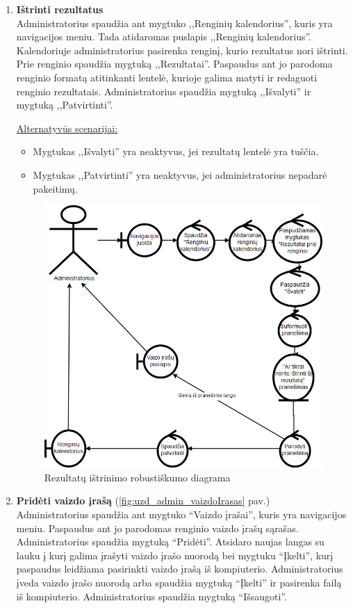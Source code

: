 \documentclass{VUMIFPSkursinis}
\begin{document}
\begin{enumerate} [label = \textbf{U\arabic*.}]
			\item \textbf{Ištrinti rezultatus}   \\
					Administratorius spaudžia ant mygtuko ,,Renginių kalendorius'', kuris yra navigacijos meniu. Tada atidaromas puslapis ,,Renginių kalendorius''. Kalendoriuje administratorius pasirenka renginį, kurio rezultatus nori ištrinti. Prie renginio spaudžia mygtuką ,,Rezultatai''. Paspaudus ant jo parodoma renginio formatą atitinkanti lentelė, kurioje galima matyti ir redaguoti renginio rezultatais. Administratorius spaudžia mygtuką ,,Išvalyti'' ir mygtuką ,,Patvirtinti''.
					
					\underline{Alternatyvūs scenarijai:}
					\begin{itemize}
						\item Mygtukas ,,Išvalyti'' yra neaktyvus, jei rezultatų lentelė yra tuščia.
						\item Mygtukas ,,Patvirtinti'' yra neaktyvus, jei administratorius nepadarė pakeitimų.
					\end{itemize}
					
					\begin{figure}[H]
						\centering
						\includegraphics[width=\textwidth]{img/PSI5/u27.png}
						\caption{Rezultatų ištrinimo robustiškumo diagrama}
						\label{draw:u27}
					\end{figure}
				
			\item \textbf{Pridėti vaizdo įrašą} (\ref{fig:uzd_admin_vaizdoIrasas} pav.)\\
					Administratorius spaudžia ant mygtuko “Vaizdo įrašai”, kuris yra navigacijos meniu. Paspaudus ant jo parodomas renginio vaizdo įrašų sąrašas. Administratorius spaudžia mygtuką “Pridėti”. Atsidaro naujas langas su lauku į kurį galima įrašyti vaizdo įrašo nuorodą bei mygtuku “Įkelti”, kurį paspaudus leidžiama pasirinkti vaizdo įrašą iš kompiuterio. Administratorius įveda vaizdo įrašo nuorodą arba spaudžia mygtuką “Įkelti” ir pasirenka failą iš kompiuterio. Administratorius spaudžia mygtuką “Išsaugoti”.
					

\end{enumerate}
\end{document}
